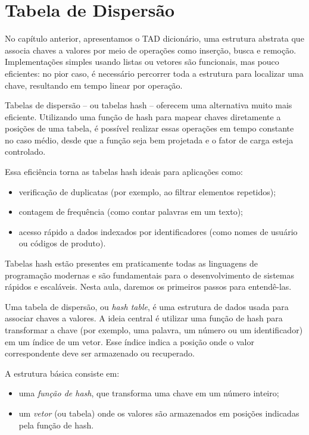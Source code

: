 \chapter{Tabela de Dispersão}

No capítulo anterior, apresentamos o TAD dicionário, uma estrutura abstrata que associa chaves a valores por meio de operações como inserção, busca e remoção. 
Implementações simples usando listas ou vetores são funcionais, mas pouco eficientes: no pior caso, é necessário percorrer toda a estrutura para localizar uma chave, resultando em tempo linear por operação.

Tabelas de dispersão -- ou tabelas hash -- oferecem uma alternativa muito mais eficiente. 
Utilizando uma função de hash para mapear chaves diretamente a posições de uma tabela, é possível realizar essas operações em tempo constante no caso médio, desde que a função seja bem projetada e o fator de carga esteja controlado.

Essa eficiência torna as tabelas hash ideais para aplicações como:
\begin{itemize}
  \item verificação de duplicatas (por exemplo, ao filtrar elementos repetidos);
  \item contagem de frequência (como contar palavras em um texto);
  \item acesso rápido a dados indexados por identificadores (como nomes de usuário ou códigos de produto).
\end{itemize}

Tabelas hash estão presentes em praticamente todas as linguagens de programação modernas e são fundamentais para o desenvolvimento de sistemas rápidos e escaláveis. 
Nesta aula, daremos os primeiros passos para entendê-las.

Uma tabela de dispersão, ou \emph{hash table}, é uma estrutura de dados usada para associar chaves a valores. 
A ideia central é utilizar uma função de hash para transformar a chave (por exemplo, uma palavra, um número ou um identificador) em um índice de um vetor.
Esse índice indica a posição onde o valor correspondente deve ser armazenado ou recuperado.

A estrutura básica consiste em:
\begin{itemize}
  \item uma \emph{função de hash}, que transforma uma chave em um número inteiro;
  \item um \emph{vetor} (ou tabela) onde os valores são armazenados em posições indicadas pela função de hash.
\end{itemize}

